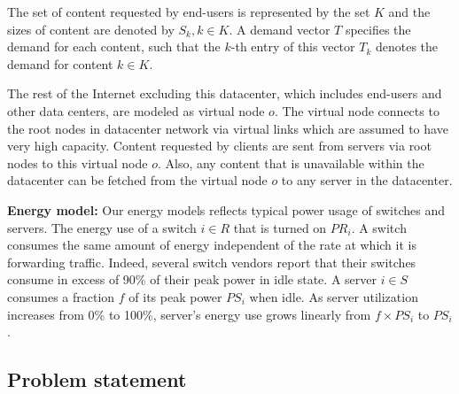 The set of content requested by end-users is represented by the set $K$ and the sizes of content are denoted by $S_k, k\in K$.  A demand vector $T$ specifies the demand for each content, such that the $k$-th entry of this vector $T_k$ denotes the demand for content $k\in K$.

The rest of the Internet excluding this datacenter, which includes end-users and other data centers, are modeled as virtual node $o$. The virtual node connects to the root nodes in datacenter network via virtual links which are assumed to have very high capacity. Content requested by clients are sent from servers via root nodes to this virtual node $o$. Also, any content that is unavailable within the datacenter can be fetched from the virtual node $o$ to  any server in the datacenter.

\textbf{Energy model:}  Our energy models reflects typical power usage  of switches and servers. The energy use of a switch  $i \in R$ that is turned on  $PR_i$. A switch consumes the same amount of energy independent of the rate at which it is forwarding traffic. Indeed, several  switch vendors report that their switches consume in excess of 90\% of their peak power in idle state. A server $i \in S$ consumes a fraction $f$ of its peak power $PS_i$ when idle. As server utilization increases from 0\% to 100\%, server's energy use grows linearly from $f\times PS_i$ to $PS_i$. 




\subsection{Problem statement}

